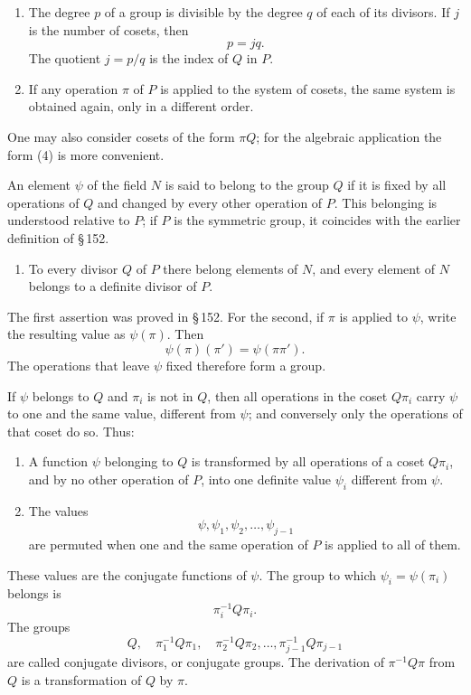 \documentclass[11pt]{article}
\begin{document}
\begin{enumerate}[label=\arabic*.,leftmargin=2em]
\item The degree $p$ of a group is divisible by the degree $q$ of each of its divisors. If $j$ is the number of cosets, then
\[
        p=jq.
\tag{5}
\]
The quotient $j=p/q$ is the index of $Q$ in $P$.
\item If any operation $\pi$ of $P$ is applied to the system of cosets, the same system is obtained again, only in a different order.
\end{enumerate}

One may also consider cosets of the form $\pi Q$; for the algebraic application the form (4) is more convenient.

An element $\psi$ of the field $N$ is said to belong to the group $Q$ if it is fixed by all operations of $Q$ and changed by every other operation of $P$. This belonging is understood relative to $P$; if $P$ is the symmetric group, it coincides with the earlier definition of \S\,152.

\begin{enumerate}[label=\arabic*.,leftmargin=2em,start=3]
\item To every divisor $Q$ of $P$ there belong elements of $N$, and every element of $N$ belongs to a definite divisor of $P$.
\end{enumerate}

The first assertion was proved in \S\,152. For the second, if $\pi$ is applied to $\psi$, write the resulting value as $\psi(\pi)$. Then
\[
        \psi(\pi)(\pi')=\psi(\pi\pi').
\tag{6}
\]
The operations that leave $\psi$ fixed therefore form a group.

If $\psi$ belongs to $Q$ and $\pi_i$ is not in $Q$, then all operations in the coset $Q\pi_i$ carry $\psi$ to one and the same value, different from $\psi$; and conversely only the operations of that coset do so. Thus:
\begin{enumerate}[label=\arabic*.,leftmargin=2em,start=4]
\item A function $\psi$ belonging to $Q$ is transformed by all operations of a coset $Q\pi_i$, and by no other operation of $P$, into one definite value $\psi_i$ different from $\psi$.
\item The values
\[
        \psi,
\psi_1,
\psi_2,
\ldots,
\psi_{j-1}
\tag{10}
\]
are permuted when one and the same operation of $P$ is applied to all of them.
\end{enumerate}

These values are the conjugate functions of $\psi$. The group to which $\psi_i=\psi(\pi_i)$ belongs is
\[
        \pi_i^{-1}Q\pi_i.
\tag{11}
\]
The groups
\[
        Q,
\quad \pi_1^{-1}Q\pi_1,
\quad \pi_2^{-1}Q\pi_2,
\ldots,
\pi_{j-1}^{-1}Q\pi_{j-1}
\tag{12}
\]
are called conjugate divisors, or conjugate groups. The derivation of $\pi^{-1}Q\pi$ from $Q$ is a transformation of $Q$ by $\pi$.
\end{document}
